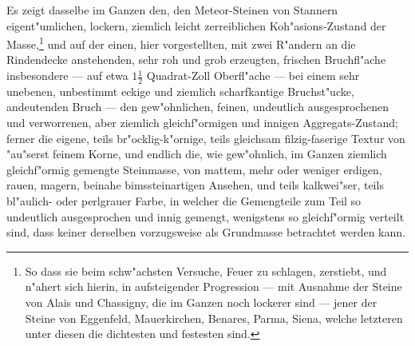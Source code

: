 \documentclass[a4paper, 11pt, oneside, german]{article}
\begin{document}
Es zeigt dasselbe im Ganzen den, den Meteor-Steinen von Stannern eigent"umlichen, lockern, ziemlich leicht zerreiblichen Koh"asions-Zustand der Masse,\footnote{So dass sie beim schw"achsten Versuche, Feuer zu schlagen, zerstiebt, und n"ahert sich hierin, in aufsteigender Progression --- mit Ausnahme der Steine von Alais und Chassigny, die im Ganzen noch lockerer sind --- jener der Steine von Eggenfeld, Mauerkirchen, Benares, Parma, Siena, welche letzteren unter diesen die dichtesten und festesten sind.} und auf der einen, hier vorgestellten, mit zwei R"andern an die Rindendecke anstehenden, sehr roh und grob erzeugten, frischen Bruchfl"ache insbesondere --- auf etwa $1\frac{1}{2}$ Quadrat-Zoll Oberfl"ache --- bei einem sehr unebenen, unbestimmt eckige und ziemlich scharfkantige Bruchst"ucke, andeutenden Bruch --- den gew"ohnlichen, feinen, undeutlich ausgesprochenen und verworrenen, aber ziemlich gleichf"ormigen und innigen Aggregats-Zustand; ferner die eigene, teils br"ocklig-k"ornige, teils gleichsam filzig-faserige Textur von "au"serst feinem Korne, und endlich die, wie gew"ohnlich, im Ganzen ziemlich gleichf"ormig gemengte Steinmasse, von mattem, mehr oder weniger erdigen, rauen, magern, beinahe bimssteinartigen Ansehen, und teils kalkwei"ser, teils bl"aulich- oder perlgrauer Farbe, in welcher die Gemengteile zum Teil so undeutlich ausgesprochen und innig gemengt, wenigstens so gleichf"ormig verteilt sind, dass keiner derselben vorzugsweise als Grundmasse betrachtet werden kann.
\end{document}
